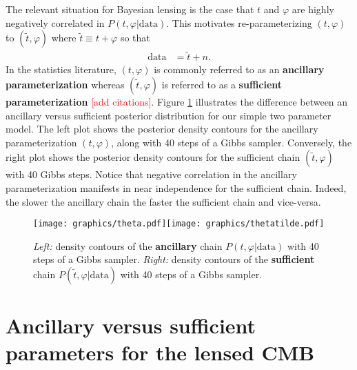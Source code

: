 \documentclass[noinfoline]{imsart}
\begin{document}
The relevant situation for Bayesian lensing is the case that $ t$ and $\varphi$ are highly negatively correlated in $P( t, \varphi|\text{data})$.  This motivates re-parameterizing $( t,\varphi)$ to $(\widetilde  t, \varphi)$ where $\widetilde  t \equiv  t + \varphi$ so that
\begin{align*}
\text{data} &= \widetilde  t + n.
\end{align*}
In the statistics literature,  $( t, \varphi)$ is commonly referred to as an {\bf ancillary parameterization} whereas $(\widetilde  t, \varphi)$ is referred to as a {\bf sufficient parameterization} \textcolor{red}{[add citations]}. Figure  \ref{fastslowGibbs} illustrates the difference between an ancillary versus sufficient posterior distribution for our simple two parameter model. The left plot shows the posterior density contours for the ancillary parameterization $( t, \varphi)$, along with 40 steps of a Gibbs sampler.  Conversely, the right plot shows the posterior density contours for the sufficient chain $(\widetilde  t, \varphi)$ with 40 Gibbs steps. Notice that negative correlation  in the ancillary parameterization manifests in near independence for the sufficient chain.  Indeed, the slower the ancillary chain the faster the sufficient chain and vice-versa. 
\begin{figure}[H]
\label{fastslowGibbs}
\texttt{[image: graphics/theta.pdf]}\texttt{[image: graphics/thetatilde.pdf]}
\caption{{\em Left:} density contours of the {\bf ancillary} chain $P( t, \varphi|\text{data})$ with 40 steps of a Gibbs sampler. {\em Right:} density contours of the {\bf sufficient}  chain $P(\widetilde  t, \varphi|\text{data})$ with 40 steps of a Gibbs sampler.}
\end{figure}
 







	
%
%
\section{Ancillary versus sufficient parameters for the lensed CMB}
\label{Section: Ancillary and sufficient parameters for the lensed CMB}
\end{document}
